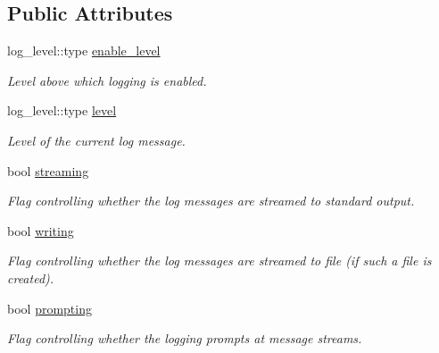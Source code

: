 \subsection*{Public Attributes}
\begin{DoxyCompactItemize}
\item 
\hypertarget{a00330_a3171337db250824f825a71777b18a5a6}{}log\+\_\+level\+::type \hyperlink{a00330_a3171337db250824f825a71777b18a5a6}{enable\+\_\+level}\label{a00330_a3171337db250824f825a71777b18a5a6}

\begin{DoxyCompactList}\small\item\em Level above which logging is enabled. \end{DoxyCompactList}\item 
\hypertarget{a00330_ab5fa0b81374949814298ef5e505410e7}{}log\+\_\+level\+::type \hyperlink{a00330_ab5fa0b81374949814298ef5e505410e7}{level}\label{a00330_ab5fa0b81374949814298ef5e505410e7}

\begin{DoxyCompactList}\small\item\em Level of the current log message. \end{DoxyCompactList}\item 
bool \hyperlink{a00330_a27e6b54cae2e0c36403e0002bbcd1b2c}{streaming}
\begin{DoxyCompactList}\small\item\em Flag controlling whether the log messages are streamed to standard output. \end{DoxyCompactList}\item 
bool \hyperlink{a00330_a6731cdd504121f6565943c9875ab6814}{writing}
\begin{DoxyCompactList}\small\item\em Flag controlling whether the log messages are streamed to file (if such a file is created). \end{DoxyCompactList}\item 
\hypertarget{a00330_a7179753a14e4ef7929aa6c6f2c8da310}{}bool \hyperlink{a00330_a7179753a14e4ef7929aa6c6f2c8da310}{prompting}\label{a00330_a7179753a14e4ef7929aa6c6f2c8da310}

\begin{DoxyCompactList}\small\item\em Flag controlling whether the logging prompts at message streams. \end{DoxyCompactList}\end{DoxyCompactItemize}


